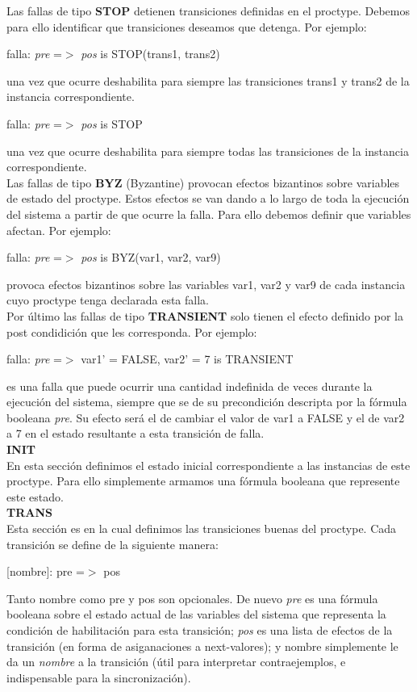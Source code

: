 \documentclass[titlepage, 12pt]{book}
\begin{document}
	Las fallas de tipo \textbf{STOP} detienen transiciones definidas en el proctype. Debemos para ello identificar que transiciones deseamos que detenga. Por ejemplo:
\begin{center}falla: \textit{pre} =$>$ \textit{pos} is STOP(trans1, trans2)\end{center}
una vez que ocurre deshabilita para siempre las transiciones trans1 y trans2 de la instancia correspondiente.
\begin{center}falla: \textit{pre} =$>$ \textit{pos} is STOP\end{center}
una vez que ocurre deshabilita para siempre todas las transiciones de la instancia correspondiente.\\

Las fallas de tipo \textbf{BYZ} (Byzantine) provocan efectos bizantinos sobre variables de estado del proctype. Estos efectos se van dando a lo largo de toda la ejecuci\'on del sistema a partir de que ocurre la falla. Para ello debemos definir que variables afectan. Por ejemplo:
\begin{center}falla: \textit{pre} =$>$ \textit{pos} is BYZ(var1, var2, var9) \end{center}
provoca efectos bizantinos sobre las variables var1, var2 y var9 de cada instancia cuyo proctype tenga declarada esta falla.\\

Por \'ultimo las fallas de tipo \textbf{TRANSIENT} solo tienen el efecto definido por la post condidici\'on que les corresponda.
Por ejemplo:
\begin{center}falla: \textit{pre} =$>$ var1' = FALSE, var2' = 7 is TRANSIENT\end{center}
es una falla que puede ocurrir una cantidad indefinida de veces durante la ejecuci\'on del sistema, siempre que se de su precondici\'on descripta por la f\'ormula booleana \textit{pre}. Su efecto ser\'a el de cambiar el valor de var1 a FALSE y el de var2 a 7 en el estado resultante a esta transici\'on de falla.\\


\noindent \textbf{INIT}\\
\indent En esta secci\'on definimos el estado inicial correspondiente a las instancias de este proctype. Para ello simplemente armamos una f\'ormula booleana que represente este estado.\\

\noindent \textbf{TRANS}\\
\indent Esta secci\'on es en la cual definimos las transiciones buenas del proctype. Cada transici\'on se define de la siguiente manera:
\begin{center}[nombre]: pre =$>$ pos\end{center}
Tanto nombre como pre y pos son opcionales. De nuevo \textit{pre} es una f\'ormula booleana sobre el estado actual de las variables del sistema que representa la condici\'on de habilitaci\'on para esta transici\'on; \textit{pos} es una lista de efectos de la transici\'on (en forma de asiganaciones a next-valores); y nombre simplemente le da un \textit{nombre} a la transici\'on (\'util para interpretar contraejemplos, e indispensable para la sincronizaci\'on).\\
\end{document}
